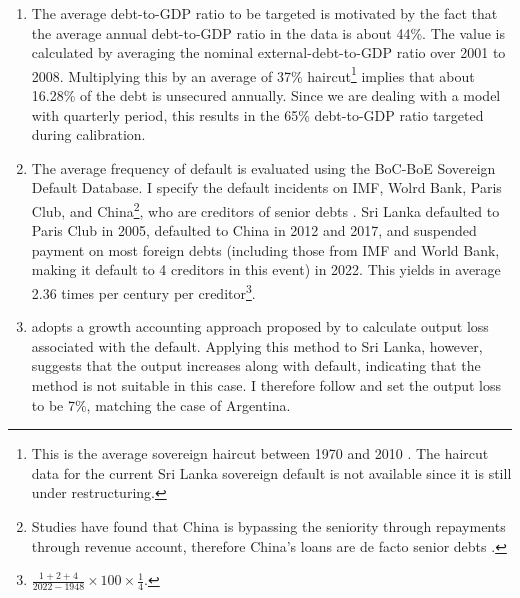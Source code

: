 \begin{enumerate}[label = (\roman*)]
    \item
    The average debt-to-GDP ratio to be targeted is motivated by the fact that the average annual debt-to-GDP ratio in the data is about 44\%.
    The value is calculated by averaging the nominal external-debt-to-GDP ratio over 2001 to 2008\footnotemark{}.
    Multiplying this by an average of 37\% haircut\footnote{This is the average sovereign haircut between 1970 and 2010 \citep{Cruces-Trebesch-13}. The haircut data for the current Sri Lanka sovereign default is not available since it is still under restructuring.} implies that about 16.28\% of the debt is unsecured annually\footnotemark{}.
    Since we are dealing with a model with quarterly period, this results in the 65\% debt-to-GDP ratio targeted during calibration.
    \item
    The average frequency of default is evaluated using the BoC-BoE Sovereign Default Database. I specify the default incidents on IMF, Wolrd Bank, Paris Club, and China\footnote{
        Studies have found that China is bypassing the seniority through repayments through revenue account, therefore China's loans are de facto senior debts \citep{Gelpern-22,Chen-Muyang-23-china-debt-seniority}.
    }, who are creditors of senior debts \citep{debt-seniority-19}. Sri Lanka defaulted to Paris Club in 2005, defaulted to China in 2012 and 2017, and suspended payment on most foreign debts (including those from IMF and World Bank, making it default to 4 creditors in this event) in 2022. This yields in average 2.36 times per century per creditor\footnote{$\frac{1+2+4}{2022 - 1948}\times 100 \times \frac{1}{4}$. }.
    \item  \citet{Na-18} adopts a growth accounting approach proposed by \citet{zarazaga-12} to calculate output loss associated with the default. Applying this method to Sri Lanka, however, suggests that the output increases along with default, indicating that the method is not suitable in this case\footnotemark{}. I therefore follow \citet{Na-18} and set the output loss to be 7\%, matching the case of Argentina.
\end{enumerate}

